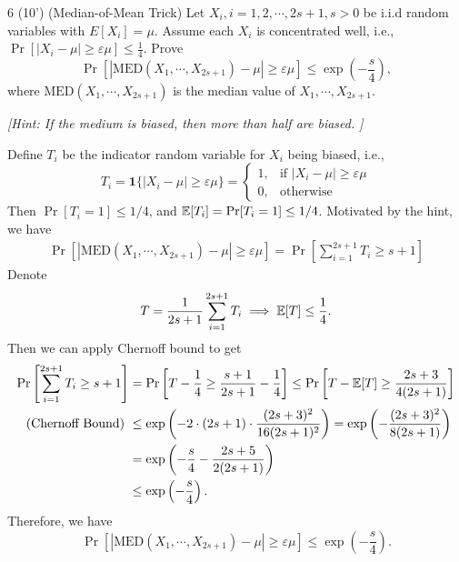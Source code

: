\begin{question}{6 (10') (Median-of-Mean Trick)} 
    Let $X_i,i=1,2,\cdots,2s+1,s>0$ be i.i.d random variables with $E\left[X_i\right]=\mu$. 
    Assume each $X_i$ is concentrated well, i.e., $\Pr[|X_i-\mu|\geq \varepsilon \mu]\leq \frac{1}{4}$. 
    Prove 
    $$
    \Pr[|\text{MED}(X_1,\cdots,X_{2s+1}) - \mu|\geq \varepsilon\mu]\leq \exp\left(-\frac{s}{4}\right),
    $$ 
    where $\text{MED}(X_1,\cdots,X_{2s+1})$ is the median value of $X_1,\cdots,X_{2s+1}$.

    \textit{[Hint: If the medium is biased, then more than half are biased. ]}
\end{question}

\begin{answer}
    Define $T_i$ be the indicator random variable for $X_i$ being biased, i.e.,
    \[
        T_i = \mathbf{1} \{|X_i - \mu| \geq \varepsilon \mu\} = \begin{cases}
            1, & \text{if } |X_i - \mu| \geq \varepsilon \mu \\
            0, & \text{otherwise}
        \end{cases}
    \]
    Then $\Pr[T_i = 1] \leq 1/4$, and $\mathbb{E}[T_i] = \Pr[T_i = 1] \leq 1/4$. Motivated by the hint, we have 
    \begin{align*}
        \Pr\left[|\text{MED}(X_1,\cdots,X_{2s+1}) - \mu| \geq \varepsilon \mu\right] = \Pr\left[\sum_{i=1}^{2s+1} T_i \ge s+1\right]
    \end{align*}
    Denote 
    \begin{align*}
        T = \frac{1}{2s+1} \sum_{i=1}^{2s+1} T_i \implies \mathbb{E}[T] \le \frac{1}{4}. 
    \end{align*}
    Then we can apply Chernoff bound to get
    \begin{align*}
        \Pr\left[\sum_{i=1}^{2s+1} T_i \ge s+1\right] &= \Pr\left[T - \frac{1}{4} \ge \frac{s+1}{2s+1} - \frac{1}{4}\right] \le \Pr\left[T - \mathbb{E}[T] \ge \frac{2s+3}{4(2s+1)}\right] \\
        \text{(Chernoff Bound) }&\le \exp\left(-2\cdot (2s+1) \cdot \frac{(2s+3)^2}{16(2s+1)^2}\right) = \exp\left(-\frac{(2s+3)^2}{8(2s+1)}\right) \\
        &= \exp\left(-\frac{s}{4} - \frac{2s+5}{2(2s+1)}\right) \\
        &\le \exp\left(-\frac{s}{4}\right).
    \end{align*}
    Therefore, we have
    \[
        \Pr\left[|\text{MED}(X_1,\cdots,X_{2s+1}) - \mu| \geq \varepsilon \mu\right] \leq \exp\left(-\frac{s}{4}\right).
    \]
    \ed
\end{answer}